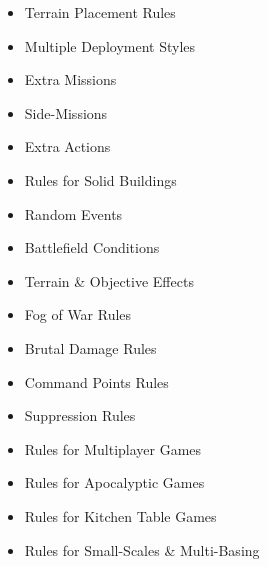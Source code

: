 \documentclass[9pt, a4paper]{extarticle}            %
\begin{document}
\begin{multicols}{2}
\begin{itemize}
  \item Terrain Placement Rules
  \item Multiple Deployment Styles
  \item Extra Missions
  \item Side-Missions
  \item Extra Actions
  \item Rules for Solid Buildings
  \item Random Events
  \item Battlefield Conditions
  \item Terrain \& Objective Effects
  \item Fog of War Rules
  \item Brutal Damage Rules
  \item Command Points Rules
  \item Suppression Rules
  \item Rules for Multiplayer Games
  \item Rules for Apocalyptic Games
  \item Rules for Kitchen Table Games
  \item Rules for Small-Scales \& Multi-Basing
\end{itemize}

\vfill\null

\end{multicols}

\end{document}
